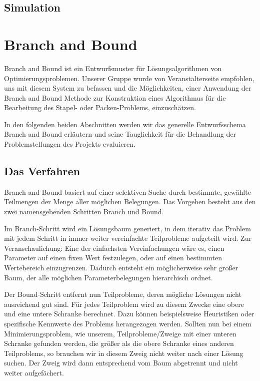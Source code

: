 \documentclass[runningheads,a4paper]{llncs}
\begin{document}
\subsection{Simulation}

\section{Branch and Bound}

Branch and Bound ist ein Entwurfsmuster für Lösungsalgorithmen von Optimierungsproblemen. Unserer Gruppe wurde von Veranstalterseite empfohlen, uns mit diesem System zu befassen und  die Möglichkeiten, einer Anwendung der Branch and Bound Methode zur Konstruktion eines Algorithmus für die Bearbeitung des Stapel- oder Packen-Problems, einzuschätzen.

In den folgenden beiden Abschnitten werden wir das generelle Entwurfsschema Branch and Bound erläutern und seine Tauglichkeit für die Behandlung der Problemstellungen des Projekts evaluieren.

\subsection{Das Verfahren}

Branch and Bound basiert auf einer selektiven Suche durch bestimmte, gewählte Teilmengen der Menge aller möglichen Belegungen. Das Vorgehen besteht aus den zwei namensgebenden Schritten Branch und Bound.

Im Branch-Schritt wird ein Lösungsbaum generiert, in dem iterativ das Problem mit jedem Schritt in immer weiter vereinfachte Teilprobleme aufgeteilt wird. Zur Veranschaulichung: Eine der einfachsten Vereinfachungen wäre es, einen Parameter auf einen fixen Wert festzulegen, oder auf einen bestimmten Wertebereich einzugrenzen. 
Dadurch entsteht ein möglicherweise sehr großer Baum, der alle möglichen Parameterbelegungen hierarchisch ordnet.

Der Bound-Schritt entfernt nun Teilprobleme, deren mögliche Lösungen nicht ausreichend gut sind. Für jedes Teilproblem wird zu diesem Zwecke eine obere und eine untere Schranke berechnet. Dazu können beispielsweise Heuristiken oder spezifische Kennwerte des Problems herangezogen werden.
Sollten nun bei einem Minimierungsproblem, wie unserem, Teilprobleme/Zweige mit einer unteren Schranke gefunden werden, die größer als die obere Schranke eines anderen Teilproblems, so brauchen wir in diesem Zweig nicht weiter nach einer Lösung suchen. Der Zweig wird dann entsprechend vom Baum abgetrennt und nicht weiter aufgefächert.
\end{document}
